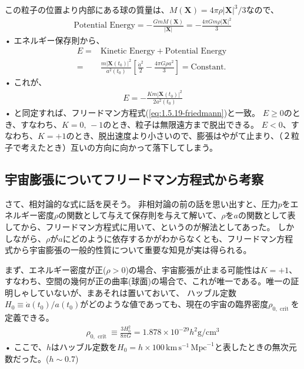 \documentclass[11pt,a4paper,dvipdfmx]{jsarticle}
\theoremstyle{plain}
\theoremstyle{break}
\begin{document}
この粒子の位置より内部にある球の質量は、$M(\mathbf{X})=4 \pi \rho|\mathbf{X}|^{3} / 3$なので、
\begin{align}
  \mathrm{Potential \,\,Energy}=-\frac{G m M(\mathbf{X})}{|\mathbf{X}|}=-\frac{4 \pi G m \rho|\mathbf{X}|^{2}}{3}
\end{align}•%
エネルギー保存則から、
\begin{align}
  E
  	=& \mathrm{Kinetic\,\,Energy} +\mathrm{Potential \,\,Energy} \\
	=&\frac{m\left|\mathbf{X}\left(t_{0}\right)\right|^{2}}{a^{2}\left(t_{0}\right)}\left[\frac{\dot{a}^{2}}{2}-\frac{4 \pi G \rho a^{2}}{3}\right]
	=\text {Constant. }
\end{align}•%
これが、
\begin{align}
  E=-\frac{K m\left|\mathbf{X}\left(t_{0}\right)\right|^{2}}{2 a^{2}\left(t_{0}\right)}
\end{align}•%
と同定すれば、フリードマン方程式(\eqref{eq:1.5.19-friedmann})と一致。
$E \geq 0$のとき、すなわち、$K = 0 , \,-1$のとき、粒子は無限遠方まで脱出できる。
$E < 0 $、すなわち、$K = +1 $のとき、脱出速度より小さいので、膨張はやがて止まり、（２粒子で考えたとき）互いの方向に向かって落下してしまう。

\subsection{宇宙膨張についてフリードマン方程式から考察}
さて、相対論的な式に話を戻そう。
非相対論の前の話を思い出すと、圧力$p$をエネルギー密度$\rho$の関数として与えて保存則を与えて解いて、$\rho$を$a$の関数として表してから、フリードマン方程式に用いて、というのが解法としてあった。
しかしながら、$\rho$が$a$にどのように依存するかがわからなくとも、フリードマン方程式から宇宙膨張の一般的性質について重要な知見が実は得られる。

まず、エネルギー密度が正($\rho > 0$)の場合、宇宙膨張が止まる可能性は$K = +1$、すなわち、空間の幾何が正の曲率(球面)の場合で、これが唯一である。唯一の証明しゃしていないが、まあそれは置いておいて、
ハッブル定数$H_{0} \equiv \dot{a}\left(t_{0}\right) / a\left(t_{0}\right)$がどのような値であっても、現在の宇宙の臨界密度$\rho_{0, \text { crit }} $を定義できる。
\begin{align}
  \rho_{0, \text { crit }} \equiv \frac{3 H_{0}^{2}}{8 \pi G}=1.878 \times 10^{-29} h^{2} \mathrm{g} / \mathrm{cm}^{3}
\end{align}•%
ここで、$h$はハッブル定数を$H_{0}=h \times 100 \, \mathrm{km} \, \mathrm{s}^{-1} \,\mathrm{Mpc}^{-1}$と表したときの無次元数だった。($h \sim 0.7$)
\end{document}
